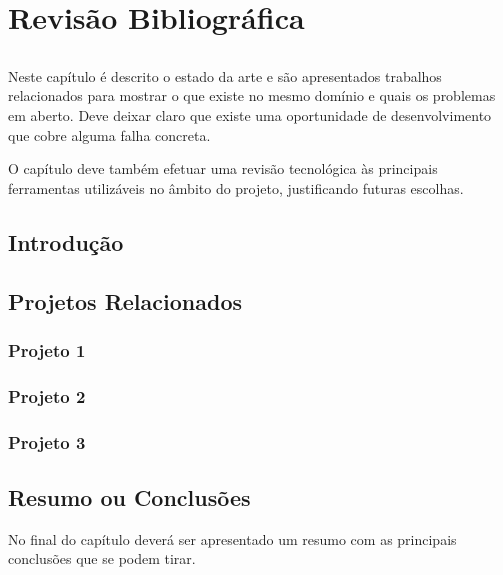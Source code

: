 
\chapter{Revisão Bibliográfica} \label{chap:chap2}

\section*{}

Neste capítulo é descrito o estado da arte e são
apresentados trabalhos relacionados para mostrar o que existe no
mesmo domínio e quais os problemas em aberto.
Deve deixar claro que existe uma oportunidade de desenvolvimento que
cobre alguma falha concreta.

O capítulo deve também efetuar uma revisão tecnológica às principais
ferramentas utilizáveis no âmbito do projeto, justificando futuras
escolhas.

\section{Introdução}

\lipsum

\section{Projetos Relacionados} %
\label{sec:projetos_relacionados}

\lipsum[2]

\subsection{Projeto 1} %
\label{sub:projeto_1}

\lipsum


\subsection{Projeto 2} %
\label{sub:projeto_2}

\lipsum


\subsection{Projeto 3} %
\label{sub:projeto_3}

\lipsum




\section{Resumo ou Conclusões}

No final do capítulo deverá ser apresentado um resumo com as 
principais conclusões que se podem tirar. 

\lipsum